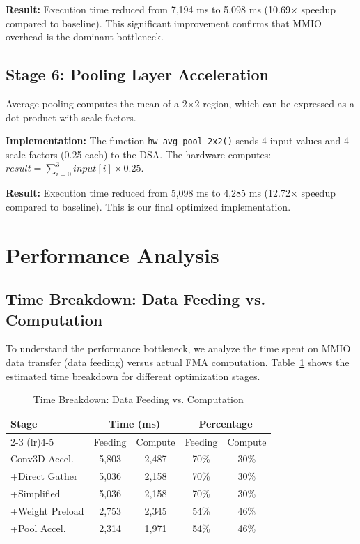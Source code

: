 \documentclass[conference]{IEEEtran}
\begin{document}
\textbf{Result:} Execution time reduced from 7,194 ms to 5,098 ms (10.69$\times$ speedup compared to baseline). This significant improvement confirms that MMIO overhead is the dominant bottleneck.

\subsection{Stage 6: Pooling Layer Acceleration}

Average pooling computes the mean of a 2$\times$2 region, which can be expressed as a dot product with scale factors.

\textbf{Implementation:} The function \texttt{hw\_avg\_pool\_2x2()} sends 4 input values and 4 scale factors (0.25 each) to the DSA. The hardware computes: $result = \sum_{i=0}^{3} input[i] \times 0.25$.

\textbf{Result:} Execution time reduced from 5,098 ms to 4,285 ms (12.72$\times$ speedup compared to baseline). This is our final optimized implementation.

\section{Performance Analysis}

\subsection{Time Breakdown: Data Feeding vs. Computation}

To understand the performance bottleneck, we analyze the time spent on MMIO data transfer (data feeding) versus actual FMA computation. Table~\ref{tab:time_breakdown} shows the estimated time breakdown for different optimization stages.

\begin{table}[htbp]
\caption{Time Breakdown: Data Feeding vs. Computation}
\label{tab:time_breakdown}
\centering
\begin{tabular}{@{}lcccc@{}}
\toprule
\multirow{2}{*}{Stage} & \multicolumn{2}{c}{Time (ms)} & \multicolumn{2}{c}{Percentage} \\
\cmidrule(lr){2-3} \cmidrule(lr){4-5}
 & Feeding & Compute & Feeding & Compute \\
\midrule
Conv3D Accel. & 5,803 & 2,487 & 70\% & 30\% \\
+Direct Gather & 5,036 & 2,158 & 70\% & 30\% \\
+Simplified & 5,036 & 2,158 & 70\% & 30\% \\
+Weight Preload & 2,753 & 2,345 & 54\% & 46\% \\
+Pool Accel. & 2,314 & 1,971 & 54\% & 46\% \\
\bottomrule
\end{tabular}
\end{table}
\end{document}
